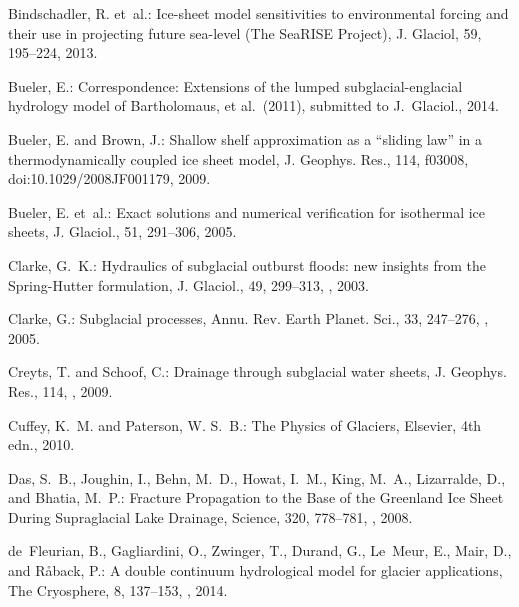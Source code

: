\documentclass[gmd]{copernicus}   %
\begin{document}
\begin{thebibliography}{68}
Bindschadler, R. et~al.: Ice-sheet model sensitivities to environmental forcing
  and their use in projecting future sea-level ({T}he {S}ea{RISE} {P}roject),
  J. Glaciol, 59, 195--224, 2013.

Bueler, E.: Correspondence: Extensions of the lumped subglacial-englacial
  hydrology model of {B}artholomaus, et al.~(2011), submitted to J.~Glaciol.,
  2014.

Bueler, E. and Brown, J.: Shallow shelf approximation as a ``sliding law'' in a
  thermodynamically coupled ice sheet model, J. Geophys. Res., 114, f03008,
  doi:10.1029/2008JF001179, 2009.

Bueler, E. et~al.: Exact solutions and numerical verification for isothermal ice sheets,
  J. Glaciol., 51, 291--306, 2005.

Clarke, G.~K.: Hydraulics of subglacial outburst floods: new insights from the
  {Spring-Hutter} formulation, J. Glaciol., 49, 299--313,
  , 2003.

Clarke, G.: Subglacial processes, Annu. Rev. Earth Planet. Sci., 33,
  247--276, , 2005.

Creyts, T. and Schoof, C.: Drainage through subglacial water sheets, J.
  Geophys. Res., 114, , 2009.

Cuffey, K.~M. and Paterson, W. S.~B.: The {P}hysics of {G}laciers, Elsevier,
  4th edn., 2010.

Das, S.~B., Joughin, I., Behn, M.~D., Howat, I.~M., King, M.~A., Lizarralde,
  D., and Bhatia, M.~P.: {Fracture Propagation to the Base of the Greenland Ice
  Sheet During Supraglacial Lake Drainage}, Science, 320, 778--781,
  , 2008.

de~Fleurian, B., Gagliardini, O., Zwinger, T., Durand, G., Le~Meur, E., Mair,
  D., and R{\aa}back, P.: A double continuum hydrological model for glacier
  applications, The Cryosphere, 8, 137--153, , 2014.


\end{thebibliography}
\end{document}
